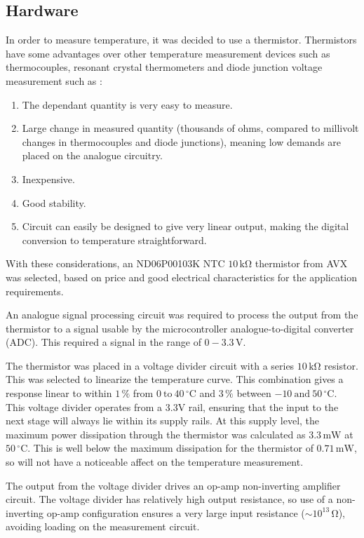 \documentclass[a4paper,10pt]{article}  %
\providecommand{\degrees}{\ensuremath{^{\circ}}}
\begin{document}
\subsection{Hardware}
\label{sec:hardware}

In order to measure temperature, it was decided to use a
thermistor. Thermistors have some advantages over other temperature
measurement devices such as thermocouples, resonant crystal
thermometers and diode junction voltage measurement such as \cite{HH}:
\begin{enumerate}
  \item The dependant quantity is very easy to measure.
  \item Large change in measured quantity (thousands of ohms, compared
    to millivolt changes in thermocouples and diode junctions), meaning
    low demands are placed on the analogue circuitry.
  \item Inexpensive.
  \item Good stability.
  \item Circuit can easily be designed to give very linear output,
    making the digital conversion to temperature straightforward.
\end{enumerate}
With these considerations, an ND06P00103K NTC $10\,\mathrm{k\Omega}$
thermistor from AVX was selected, based on price and good electrical
characteristics for the application requirements. 

An analogue signal processing circuit was required to process the
output from the thermistor to a signal usable by the microcontroller
analogue-to-digital converter (ADC). This required a signal in the
range of $0-3.3\,\mathrm{V}$.

The thermistor was placed in a voltage divider circuit with a series
$10\,\mathrm{k\Omega}$ resistor. This was selected to linearize the
temperature curve. This combination gives a response linear to within
$1\,\mathrm{\%}$ from $0\ \mathrm{to}\ 40\,\mathrm{\degrees C}$ and
$3\,\mathrm{\%}$ between $-10\ \mathrm{and}\ 50\,\mathrm{\degrees
  C}$\cite{HH}. This voltage divider operates from a 3.3V rail, ensuring that
the input to the next stage will always lie within its supply
rails. At this supply level, the maximum power dissipation through the
thermistor was calculated as $3.3\,\mathrm{mW}$ at
$50\,\mathrm{\degrees C}$. This is well below the maximum dissipation
for the thermistor of $0.71\,\mathrm{mW}$, so will not have a
noticeable affect on the temperature measurement.

The output from the voltage divider drives an op-amp non-inverting
amplifier circuit. The voltage divider has relatively high output
resistance, so use of a non-inverting op-amp configuration ensures a
very large input resistance ($\sim 10^{13}\, \mathrm{\Omega}$),
avoiding loading on the measurement circuit.
\end{document}
